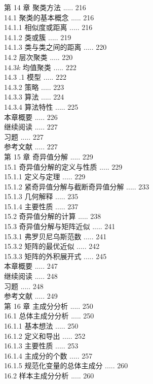 \documentclass[10pt]{article}
\begin{document}
\begin{CJK*}{UTF8}{bsmi}
第 14 章 聚类方法 ..... 216\\
14.1 聚类的基本概念 ..... 216\\
14.1.1 相似度或距离 ..... 216\\
14.1.2 类或簇 ..... 219\\
14.1.3 类与类之间的距离 ..... 220\\
14.2 层次聚类 ..... 220\\
$14.3 k$ 均值聚类 ..... 222\\
14.3 .1 模型 ..... 222\\
14.3.2 策略 ..... 223\\
14.3.3 算法 ..... 224\\
14.3.4 算法特性 ..... 225\\
本章概要 ..... 226\\
继续阅读 ..... 227\\
习题 ..... 227\\
参考文献 ..... 227\\
第 15 章 奇异值分解 ..... 229\\
15.1 奇异值分解的定义与性质 ..... 229\\
15.1.1 定义与定理 ..... 229\\
15.1.2 紧奇异值分解与截断奇异值分解 ..... 233\\
15.1.3 几何解释 ..... 235\\
15.1.4 主要性质 ..... 237\\
15.2 奇异值分解的计算 ..... 238\\
15.3 奇异值分解与矩阵近似 ..... 241\\
15.3.1 弗罗贝尼乌斯范数 ..... 241\\
15.3.2 矩阵的最优近似 ..... 242\\
15.3.3 矩阵的外积展开式 ..... 245\\
本章概要 ..... 247\\
继续阅读 ..... 248\\
习题 ..... 248\\
参考文献 ..... 249\\
第 16 章 主成分分析 ..... 250\\
16.1 总体主成分分析 ..... 250\\
16.1.1 基本想法 ..... 250\\
16.1.2 定义和导出 ..... 252\\
16.1.3 主要性质 ..... 253\\
16.1.4 主成分的个数 ..... 257\\
16.1.5 规范化变量的总体主成分 ..... 260\\
16.2 样本主成分分析 ..... 260\\

\end{CJK*}
\end{document}
